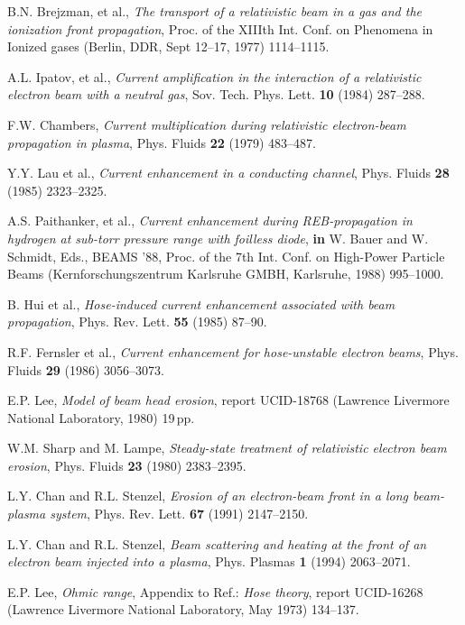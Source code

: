 \documentclass [12pt,a4paper,     ]{report} %
\begin{document}
\begin{enumerate}

 B.N. Brejzman, et al., \emph{The transport of a relativistic beam in a gas and the ionization front propagation}, Proc. of the XIIIth Int. Conf. on Phenomena in Ionized gases (Berlin, DDR, Sept 12--17, 1977) 1114--1115.

 A.L. Ipatov, et al., \emph{Current amplification in the interaction of a relativistic electron beam with a neutral gas}, Sov. Tech. Phys. Lett. {\bf 10} (1984) 287--288.

 F.W. Chambers, \emph{Current multiplication during relativistic electron-beam propagation in plasma}, Phys. Fluids {\bf 22} (1979) 483--487.

 Y.Y. Lau et al., \emph{Current enhancement in a conducting channel}, Phys. Fluids {\bf 28} (1985) 2323--2325.

 A.S. Paithanker, et al., \emph{Current enhancement during REB-propagation in hydrogen at sub-torr pressure range with foilless diode}, {\bf in} W. Bauer and W. Schmidt, Eds., BEAMS '88, Proc. of the 7th Int. Conf. on High-Power Particle Beams (Kernforschungszentrum Karlsruhe GMBH, Karlsruhe, 1988) 995--1000.

 B. Hui et al., \emph{Hose-induced current enhancement associated with beam propagation}, Phys. Rev. Lett. {\bf 55} (1985) 87--90.

 R.F. Fernsler et al., \emph{Current enhancement for hose-unstable electron beams}, Phys. Fluids {\bf 29} (1986) 3056--3073.



 E.P. Lee, \emph{Model of beam head erosion}, report UCID-18768 (Lawrence Livermore National Laboratory, 1980) 19\,pp.

 W.M. Sharp and M. Lampe, \emph{Steady-state treatment of relativistic electron beam erosion}, Phys. Fluids {\bf 23} (1980) 2383--2395.

 L.Y. Chan and R.L. Stenzel, \emph{Erosion of an electron-beam front in a long beam-plasma system}, Phys. Rev. Lett. {\bf 67} (1991) 2147--2150.

 L.Y. Chan and R.L. Stenzel, \emph{Beam scattering and heating at the front of an electron beam injected into a plasma}, Phys. Plasmas {\bf 1} (1994) 2063--2071.

 E.P. Lee, \emph{Ohmic range}, Appendix to Ref.\cite{LEE--1973B}: \emph{Hose theory}, report UCID-16268 (Lawrence Livermore National Laboratory, May 1973) 134--137.


\end{enumerate}
\end{document}
